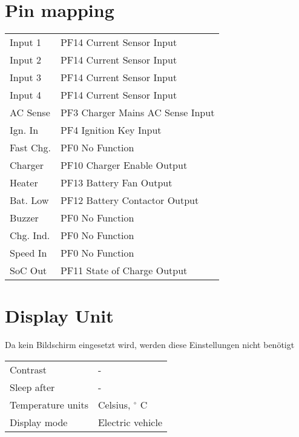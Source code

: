 \section*{Pin mapping}
\color{blue}
\begin{tabular}{p{4cm}p{11cm}}
	Input 1 & PF14 Current Sensor Input \\
	Input 2 & PF14 Current Sensor Input \\
	Input 3 & PF14 Current Sensor Input \\
	Input 4 & PF14 Current Sensor Input \\
	AC Sense & PF3 Charger Mains AC Sense Input \\
	Ign. In & PF4 Ignition Key Input \\
	Fast Chg. & PF0 No Function \\
	Charger & PF10 Charger Enable Output \\
	Heater & PF13 Battery Fan Output \\
	Bat. Low & PF12 Battery Contactor Output \\
	Buzzer & PF0 No Function \\
	Chg. Ind. & PF0 No Function \\
	Speed In & PF0 No Function \\
	SoC Out & PF11 State of Charge Output
\end{tabular}
\color{black}

\section*{Display Unit}
Da kein Bildschirm eingesetzt wird, werden diese Einstellungen nicht benötigt \\
\begin{tabular}{p{11cm}p{4cm}}
	Contrast & - \\
	Sleep after & - \\
	Temperature units & Celsius, $^\circ$ C \\
	Display mode & Electric vehicle
\end{tabular}
\newpage

